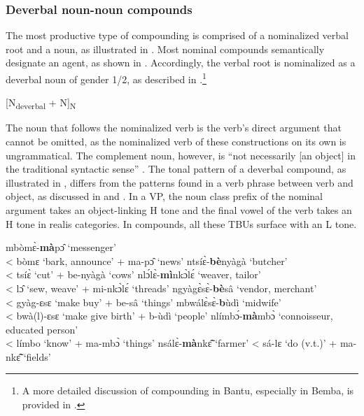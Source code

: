 \subsubsection{Deverbal noun-noun compounds}
\label{sec:VNCompound}


The most productive type of compounding is comprised of a nominalized verbal root and a noun, as illustrated in . Most nominal compounds semantically designate an agent, as shown in . Accordingly, the verbal root is nominalized as a deverbal noun of gender 1/2, as described in .\footnote{A more detailed discussion of compounding in Bantu, especially in Bemba, is provided in \citet{basciano2011}.}

\ea \label{CompoundTemp} [N\textsubscript{deverbal} + N]\textsubscript{N}
\z

The noun that follows the nominalized verb is the verb's direct argument that cannot be omitted, as the nominalized verb of these constructions on its own is ungrammatical. The complement noun, however, is ``not necessarily [an object] in the traditional syntactic sense'' \citep{schadeberg2003}. The tonal pattern of a deverbal compound, as illustrated in , differs from the patterns found in a verb phrase between verb and object, as discussed in  and . In a VP, the noun class prefix of the nominal argument takes an object-linking H tone and the final vowel of the verb takes an H tone in realis categories.  In compounds, all these TBUs surface with an L tone.

\ea \label{CompoundVN1a}
\ea  mbòmɛ̀-{\bfseries mà}pɔ̂ `messenger' \\ < bòmɛ `bark, announce' + ma-pɔ̂ `news'
\ex ntsíɛ̀-{\bfseries bè}nyàgà `butcher' \\ < tsíɛ̀ `cut' + be-nyàgà `cows'
\ex nlɔ́lɛ̀-{\bfseries mì}nkɔ̀lɛ́  `weaver, tailor' \\ <  lɔ̂ `sew, weave' + mi-nkɔ̀lɛ́ `threads'
\ex ngyàgɛ̀sɛ̀-{\bfseries bè}sâ `vendor, merchant' \\ < gyàg-ɛsɛ `make buy' + be-sâ `things'
\ex mbwálɛ̀sɛ̀-{\bfseries b}ùdì `midwife' \\ < bwà(l)-ɛsɛ `make give birth' + b-ùdì `people'
\ex nlímbɔ́-{\bfseries mà}mbɔ̀ `connoisseur, educated person' \\ <  límbo `know' + ma-mbɔ̀ `things'
\ex nsálɛ̀-{\bfseries mà}nkɛ̃̂ `farmer' < sá-lɛ `do (v.t.)' + ma-nkɛ̃̂ `fields'
\z
\z

